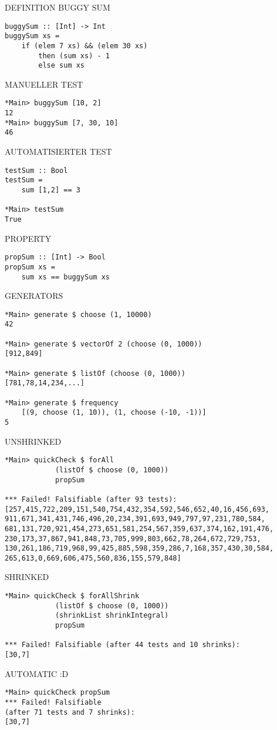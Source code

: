 \newpage

DEFINITION BUGGY SUM

\begin{verbatim}
buggySum :: [Int] -> Int
buggySum xs = 
    if (elem 7 xs) && (elem 30 xs)
        then (sum xs) - 1
        else sum xs
\end{verbatim}

MANUELLER TEST

\begin{verbatim}
*Main> buggySum [10, 2]
12
*Main> buggySum [7, 30, 10]
46
\end{verbatim}

AUTOMATISIERTER TEST

\begin{verbatim}
testSum :: Bool
testSum = 
    sum [1,2] == 3

*Main> testSum
True
\end{verbatim}

PROPERTY

\begin{verbatim}
propSum :: [Int] -> Bool
propSum xs = 
    sum xs == buggySum xs
\end{verbatim}

\newpage

GENERATORS

\begin{verbatim}
*Main> generate $ choose (1, 10000)
42

*Main> generate $ vectorOf 2 (choose (0, 1000))
[912,849]

*Main> generate $ listOf (choose (0, 1000))
[781,78,14,234,...]

*Main> generate $ frequency
    [(9, choose (1, 10)), (1, choose (-10, -1))]
5
\end{verbatim}

UNSHRINKED

\begin{verbatim}
*Main> quickCheck $ forAll 
            (listOf $ choose (0, 1000)) 
            propSum

*** Failed! Falsifiable (after 93 tests):  
[257,415,722,209,151,540,754,432,354,592,546,652,40,16,456,693,
911,671,341,431,746,496,20,234,391,693,949,797,97,231,780,584,
681,131,720,921,454,273,651,581,254,567,359,637,374,162,191,476,
230,173,37,867,941,848,73,705,999,803,662,78,264,672,729,753,
130,261,186,719,968,99,425,885,598,359,286,7,168,357,430,30,584,
265,613,0,669,606,475,560,836,155,579,848]
\end{verbatim}

SHRINKED

\begin{verbatim}
*Main> quickCheck $ forAllShrink 
            (listOf $ choose (0, 1000)) 
            (shrinkList shrinkIntegral) 
            propSum

*** Failed! Falsifiable (after 44 tests and 10 shrinks):     
[30,7]
\end{verbatim}

AUTOMATIC :D

\begin{verbatim}
*Main> quickCheck propSum
*** Failed! Falsifiable 
(after 71 tests and 7 shrinks):     
[30,7]
\end{verbatim}